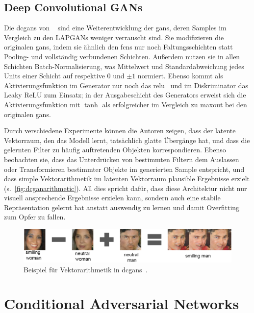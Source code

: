 \subsection{Deep Convolutional GANs}

Die \glspl{dcgan} von \citeauthor{Radford.2016}~\cite{Radford.2016} sind eine Weiterentwicklung der \glspl{gan}, deren Samples im Vergleich zu den LAPGANs weniger verrauscht sind.
Sie modifizieren die originalen \glspl{gan}, indem sie ähnlich den \glspl{fcn} nur noch Faltungsschichten statt Pooling- und vollständig verbundenen Schichten.
Außerdem nutzen sie in allen Schichten Batch-Normalisierung, was Mittelwert und Standardabweichung jedes Units einer Schicht auf respektive 0 und $ \pm 1 $ normiert.
Ebenso kommt als Aktivierungsfunktion im Generator nur noch das \gls{relu}~\cite{Nair.2010} und im Diskriminator das Leaky ReLU zum Einsatz; in der Ausgabeschicht des Generators erweist sich die Aktivierungsfunktion mit $ \tanh $ als erfolgreicher im Vergleich zu maxout bei den originalen \glspl{gan}.

Durch verschiedene Experimente können die Autoren zeigen, dass der latente Vektorraum, den das Modell lernt, tatsächlich glatte Übergänge hat, und dass die gelernten Filter zu häufig auftretenden Objekten korrespondieren.
Ebenso beobachten sie, dass das Unterdrücken von bestimmten Filtern dem Auslassen oder Transformieren bestimmter Objekte im generierten Sample entspricht, und dass simple Vektorarithmetik im latenten Vektorraum plausible Ergebnisse erzielt (s.~\autoref{fig:dcganarithmetic}).
All dies spricht dafür, dass diese Architektur nicht nur visuell ansprechende Ergebnisse erzielen kann, sondern auch eine stabile Repräsentation gelernt hat anstatt auswendig zu lernen und damit Overfitting zum Opfer zu fallen.

\begin{figure}
	\centering
	\includegraphics[width=0.9\linewidth]{img/dcgan_arithmetic}
	\caption{Beispiel für Vektorarithmetik in \glspl{dcgan}~\cite{Radford.2016}.}
	\label{fig:dcganarithmetic}
\end{figure}



\section{Conditional Adversarial Networks}

